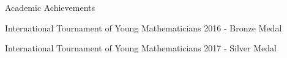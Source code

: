 \documentclass{resume} %
\newcommand{\tab}[1]{\hspace{.2667\textwidth}\rlap{#1}}
\newcommand{\itab}[1]{\hspace{0em}\rlap{#1}}
\begin{document}

\begin{rSection}{Academic Achievements} \itemsep -2pt

\item International Tournament of Young Mathematicians 2016 - Bronze Medal
\item International Tournament of Young Mathematicians 2017 - Silver Medal
\item
\end{rSection}










\end{document}
